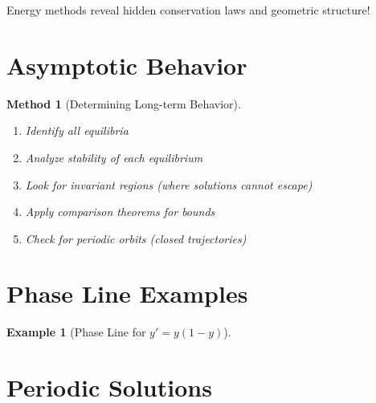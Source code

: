 \documentclass[12pt]{article}
\newtheorem{method}{Method}
\newtheorem{example}{Example}
\begin{document}
\begin{insight}
Energy methods reveal hidden conservation laws and geometric structure!
\end{insight}

\section{Asymptotic Behavior}

\begin{method}[Determining Long-term Behavior]
\begin{enumerate}
    \item Identify all equilibria
    \item Analyze stability of each equilibrium
    \item Look for invariant regions (where solutions cannot escape)
    \item Apply comparison theorems for bounds
    \item Check for periodic orbits (closed trajectories)
\end{enumerate}
\end{method}

\section{Phase Line Examples}

\begin{example}[Phase Line for $y' = y(1-y)$]
\begin{center}
\end{center}
\end{example}

\section{Periodic Solutions}
\end{document}
